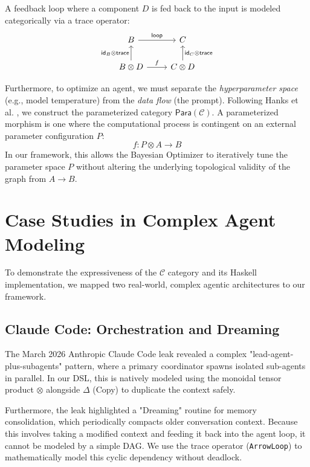 \documentclass[journal]{IEEEtran}
\begin{document}
A feedback loop where a component $D$ is fed back to the input is modeled categorically via a trace operator:
\begin{equation}
\begin{tikzcd}
B \arrow[r, "\textsf{loop}"] & C \\
B \otimes D \arrow[u, "\textsf{id}_B \otimes \textsf{trace}"] \arrow[r, "f"] & C \otimes D \arrow[u, "\textsf{id}_C \otimes \textsf{trace}"']
\end{tikzcd}
\end{equation}

Furthermore, to optimize an agent, we must separate the \textit{hyperparameter space} (e.g., model temperature) from the \textit{data flow} (the prompt). Following Hanks et al. \cite{hanks2024}, we construct the parameterized category $\textsf{Para}(\mathcal{C})$. A parameterized morphism is one where the computational process is contingent on an external parameter configuration $P$:
\begin{equation}
f : P \otimes A \to B
\end{equation}
In our framework, this allows the Bayesian Optimizer to iteratively tune the parameter space $P$ without altering the underlying topological validity of the graph from $A \to B$.

\section{Case Studies in Complex Agent Modeling}

To demonstrate the expressiveness of the $\mathcal{C}$ category and its Haskell implementation, we mapped two real-world, complex agentic architectures to our framework.

\subsection{Claude Code: Orchestration and Dreaming}
The March 2026 Anthropic Claude Code leak revealed a complex "lead-agent-plus-subagents" pattern, where a primary coordinator spawns isolated sub-agents in parallel. In our DSL, this is natively modeled using the monoidal tensor product $\otimes$ alongside $\Delta$ (Copy) to duplicate the context safely.

Furthermore, the leak highlighted a "Dreaming" routine for memory consolidation, which periodically compacts older conversation context. Because this involves taking a modified context and feeding it back into the agent loop, it cannot be modeled by a simple DAG. We use the trace operator (\texttt{ArrowLoop}) to mathematically model this cyclic dependency without deadlock.
\end{document}
